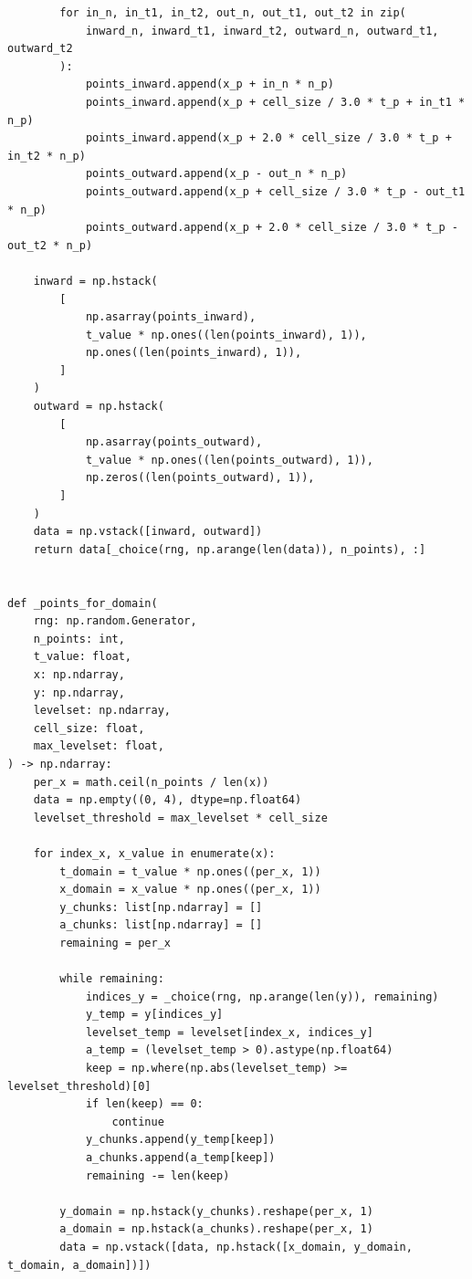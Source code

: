 \begin{lstlisting}
        for in_n, in_t1, in_t2, out_n, out_t1, out_t2 in zip(
            inward_n, inward_t1, inward_t2, outward_n, outward_t1, outward_t2
        ):
            points_inward.append(x_p + in_n * n_p)
            points_inward.append(x_p + cell_size / 3.0 * t_p + in_t1 * n_p)
            points_inward.append(x_p + 2.0 * cell_size / 3.0 * t_p + in_t2 * n_p)
            points_outward.append(x_p - out_n * n_p)
            points_outward.append(x_p + cell_size / 3.0 * t_p - out_t1 * n_p)
            points_outward.append(x_p + 2.0 * cell_size / 3.0 * t_p - out_t2 * n_p)

    inward = np.hstack(
        [
            np.asarray(points_inward),
            t_value * np.ones((len(points_inward), 1)),
            np.ones((len(points_inward), 1)),
        ]
    )
    outward = np.hstack(
        [
            np.asarray(points_outward),
            t_value * np.ones((len(points_outward), 1)),
            np.zeros((len(points_outward), 1)),
        ]
    )
    data = np.vstack([inward, outward])
    return data[_choice(rng, np.arange(len(data)), n_points), :]


def _points_for_domain(
    rng: np.random.Generator,
    n_points: int,
    t_value: float,
    x: np.ndarray,
    y: np.ndarray,
    levelset: np.ndarray,
    cell_size: float,
    max_levelset: float,
) -> np.ndarray:
    per_x = math.ceil(n_points / len(x))
    data = np.empty((0, 4), dtype=np.float64)
    levelset_threshold = max_levelset * cell_size

    for index_x, x_value in enumerate(x):
        t_domain = t_value * np.ones((per_x, 1))
        x_domain = x_value * np.ones((per_x, 1))
        y_chunks: list[np.ndarray] = []
        a_chunks: list[np.ndarray] = []
        remaining = per_x

        while remaining:
            indices_y = _choice(rng, np.arange(len(y)), remaining)
            y_temp = y[indices_y]
            levelset_temp = levelset[index_x, indices_y]
            a_temp = (levelset_temp > 0).astype(np.float64)
            keep = np.where(np.abs(levelset_temp) >= levelset_threshold)[0]
            if len(keep) == 0:
                continue
            y_chunks.append(y_temp[keep])
            a_chunks.append(a_temp[keep])
            remaining -= len(keep)

        y_domain = np.hstack(y_chunks).reshape(per_x, 1)
        a_domain = np.hstack(a_chunks).reshape(per_x, 1)
        data = np.vstack([data, np.hstack([x_domain, y_domain, t_domain, a_domain])])


\end{lstlisting}
